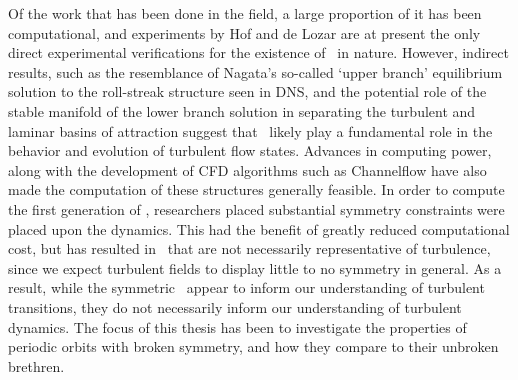 Of the work that has been done in the field, a large proportion of it has been computational, and experiments by Hof and de Lozar  are at present the only direct experimental verifications for the existence of \ecs~in nature. However, indirect results, such as the resemblance of Nagata's so-called `upper branch' equilibrium solution to the roll-streak structure seen in DNS, and the potential role of the stable manifold of the lower branch solution in separating the turbulent and laminar basins of attraction suggest that \ecs\ likely play a fundamental role in the behavior and evolution of turbulent flow states. Advances in computing power, along with the development of CFD algorithms such as Channelflow have also made the computation of these structures generally feasible. In order to compute the first generation of \ecs, researchers placed substantial symmetry constraints were placed upon the dynamics. This had the benefit of greatly reduced computational cost, but has resulted in \ecs\ that are not necessarily representative of turbulence, since we expect turbulent fields to display little to no symmetry in general. As a result, while the symmetric \ecs\ 	appear to inform our understanding of turbulent transitions, they do not necessarily inform our understanding of turbulent dynamics. The focus of this thesis has been to investigate the properties of periodic orbits with broken symmetry, and how they compare to their unbroken brethren. 
 
